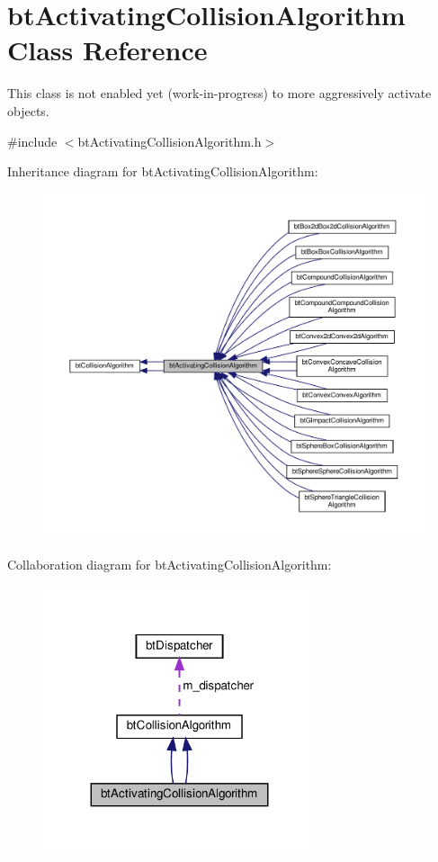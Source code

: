 \hypertarget{classbtActivatingCollisionAlgorithm}{}\section{bt\+Activating\+Collision\+Algorithm Class Reference}
\label{classbtActivatingCollisionAlgorithm}


This class is not enabled yet (work-\/in-\/progress) to more aggressively activate objects.  




{\ttfamily \#include $<$bt\+Activating\+Collision\+Algorithm.\+h$>$}



Inheritance diagram for bt\+Activating\+Collision\+Algorithm\+:
\nopagebreak
\begin{figure}[H]
\begin{center}
\leavevmode
\includegraphics[width=350pt]{classbtActivatingCollisionAlgorithm__inherit__graph}
\end{center}
\end{figure}


Collaboration diagram for bt\+Activating\+Collision\+Algorithm\+:
\nopagebreak
\begin{figure}[H]
\begin{center}
\leavevmode
\includegraphics[width=227pt]{classbtActivatingCollisionAlgorithm__coll__graph}
\end{center}
\end{figure}
